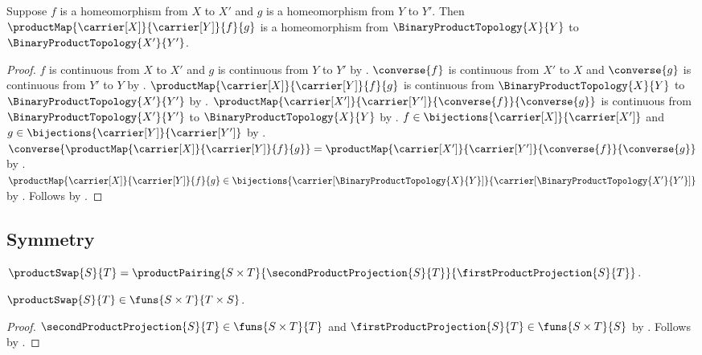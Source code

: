\begin{theorem}\label{product_map_homeomorphism}
    Suppose $f$ is a homeomorphism from $X$ to $X'$ and
        $g$ is a homeomorphism from $Y$ to $Y'$.
    Then $\productMap{\carrier[X]}{\carrier[Y]}{f}{g}$ is a homeomorphism from
        $\BinaryProductTopology{X}{Y}$ to $\BinaryProductTopology{X'}{Y'}$.
\end{theorem}
\begin{proof}
    $f$ is continuous from $X$ to $X'$ and $g$ is continuous from $Y$ to $Y'$ by
        .
    $\converse{f}$ is continuous from $X'$ to $X$ and
        $\converse{g}$ is continuous from $Y'$ to $Y$ by .
    $\productMap{\carrier[X]}{\carrier[Y]}{f}{g}$ is continuous from
        $\BinaryProductTopology{X}{Y}$ to $\BinaryProductTopology{X'}{Y'}$ by
        .
    $\productMap{\carrier[X']}{\carrier[Y']}{\converse{f}}{\converse{g}}$ is continuous from
        $\BinaryProductTopology{X'}{Y'}$ to $\BinaryProductTopology{X}{Y}$ by
        .
    $f\in\bijections{\carrier[X]}{\carrier[X']}$ and
        $g\in\bijections{\carrier[Y]}{\carrier[Y']}$ by .
    $\converse{\productMap{\carrier[X]}{\carrier[Y]}{f}{g}}
        =\productMap{\carrier[X']}{\carrier[Y']}{\converse{f}}{\converse{g}}$ by
        .
    $\productMap{\carrier[X]}{\carrier[Y]}{f}{g}\in
        \bijections{\carrier[\BinaryProductTopology{X}{Y}]}{
            \carrier[\BinaryProductTopology{X'}{Y'}]}$ by
        .
    Follows by .
\end{proof}

\subsection{Symmetry}

\begin{definition}\label{product_swap}
    $\productSwap{S}{T}
        =\productPairing{S\times T}{
            \secondProductProjection{S}{T}}{
            \firstProductProjection{S}{T}}$.
\end{definition}

\begin{proposition}\label{product_swap_type}
    $\productSwap{S}{T}\in\funs{S\times T}{T\times S}$.
\end{proposition}
\begin{proof}
    $\secondProductProjection{S}{T}\in\funs{S\times T}{T}$ and
        $\firstProductProjection{S}{T}\in\funs{S\times T}{S}$ by
        .
    Follows by .
\end{proof}

